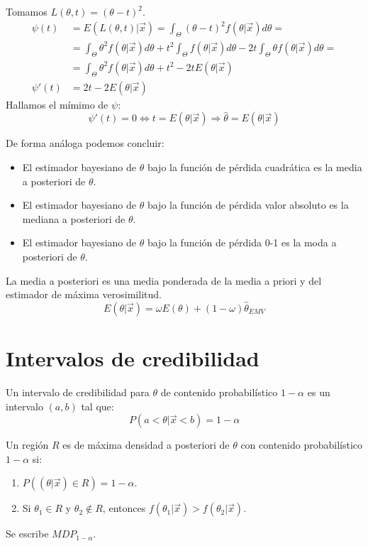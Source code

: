 \begin{example}
    Tomamos $L(\theta, t) = (\theta-t)^2$.
    \begin{align*}
        \psi(t)  & = E(L(\theta, t)|\vec{x}) = \int_\Theta (\theta-t)^2f(\theta|\vec{x})d\theta =                                                             \\
                 & = \int_\Theta \theta^2f(\theta|\vec{x})d\theta + t^2\int_\Theta f(\theta|\vec{x})d\theta - 2t\int_\Theta \theta f(\theta|\vec{x})d\theta = \\
                 & = \int_\Theta \theta^2f(\theta|\vec{x})d\theta + t^2 - 2tE(\theta|\vec{x})                                                                 \\
        \psi'(t) & = 2t - 2E(\theta|\vec{x})
    \end{align*}
    Hallamos el mímimo de $\psi$:
    $$\psi'(t) = 0 \Leftrightarrow t = E(\theta|\vec{x}) \Rightarrow \hat{\theta} = E(\theta|\vec{x})$$
\end{example}

De forma análoga podemos concluir:
\begin{itemize}
    \item El estimador bayesiano de $\theta$ bajo la función de pérdida cuadrática es la media a posteriori de $\theta$.
    \item El estimador bayesiano de $\theta$ bajo la función de pérdida valor absoluto es la mediana a posteriori de $\theta$.
    \item El estimador bayesiano de $\theta$ bajo la función de pérdida 0-1 es la moda a posteriori de $\theta$.
\end{itemize}

\begin{remark}
    La media a posteriori es una media ponderada de la media a priori y del estimador de máxima verosimilitud.
    $$E(\theta|\vec{x}) = \omega E(\theta) + (1-\omega)\hat{\theta}_{EMV}$$
\end{remark}

\section{Intervalos de credibilidad}
Un intervalo de credibilidad para $\theta$ de contenido probabilístico $1-\alpha$ es un intervalo $(a, b)$ tal que:
$$P(a < \theta|\vec{x} < b) = 1-\alpha$$

\begin{definition}
    Un región $R$ es de máxima densidad a posteriori de $\theta$ con contenido probabilístico $1-\alpha$ si:
    \begin{enumerate}
        \item $P((\theta|\vec{x}) \in R) = 1-\alpha$.
        \item Si $\theta_1 \in R$ y $\theta_2 \notin R$, entonces $f(\theta_1|\vec{x}) > f(\theta_2|\vec{x})$.
    \end{enumerate}
    Se escribe $MDP_{1-\alpha}$.
\end{definition}

